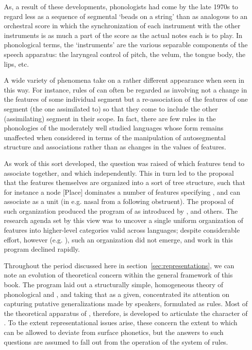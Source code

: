 As, a result of these developments, phonologists had come by the late
1970s to regard  less as a sequence of segmental `beads
on a string' than as analogous to an orchestral score in which the
synchronization of each instrument with the other instruments is as
much a part of the score as the actual notes each is to play. In
phonological terms, the `instruments' are the various separable
components of the speech apparatus: the laryngeal control of pitch,
the velum, the tongue body, the lips, etc.

A wide variety of phenomena take on a rather different appearance when
seen in this way. For instance, rules of  can often be
regarded as involving not a change in the features of some individual
segment but a re-association of the features of one segment (the one
assimilated to) so that they come to include the other (assimilating)
segment in their scope. In fact, there are few rules in the
phonologies of the moderately well studied languages whose form
remains unaffected when considered in terms of the manipulation of
autosegmental structure and associations rather than as changes in the
values of features.

\largerpage
As work of this sort developed, the question was raised of which
features tend to associate together, and which independently. This in
turn led to the proposal that the features themselves are organized
into a sort of tree structure, such that for instance a node {[Place]}
dominates a number of features specifying , and
can associate as a unit (in e.g. nasal  from a following
obstruent). The proposal of such organization produced the program of
\emph{} as introduced by \citet{clements85:geometry},
\citet{sagey90:thesis-garland} and others. The research agenda set by
this view was to uncover a single uniform organization of features
into higher-level categories valid across languages; despite
considerable effort, however
(e.g. \citealt{mccarthy:feature-geometry}), such an organization did
not emerge, and work in this program declined rapidly.

Throughout the period discussed here in
section~\ref{sec:representations}, we can note an evolution of
theoretical concern within the general framework of this book. The
\textsl{} program laid out a structurally simple, homogeneous
theory of phonological and , and taking that
as a given, concentrated its attention on capturing putative
generalizations made by speakers, formulated as rules. Most of the
theoretical apparatus of \textsl{}, therefore, is developed to
articulate the character of . To the extent
representational issues arise, these concern the extent to which
 can be allowed to deviate from surface
phonetics, but the answers to such questions are assumed to fall out
from the operation of the system of rules.

